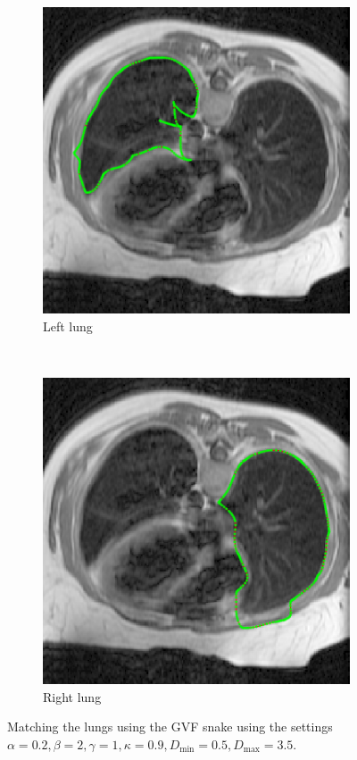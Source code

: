 \documentclass[a4paper]{article}
\begin{document}
\begin{figure}
	\centering
	\begin{subfigure}[t]{.45\textwidth}
		\includegraphics[width=\textwidth]{leftgvf}
		\caption{Left lung}
	\end{subfigure}~
	\begin{subfigure}[t]{.45\textwidth}
		\includegraphics[width=\textwidth]{rightgvf}
		\caption{Right lung}
	\end{subfigure}
	\caption{Matching the lungs using the GVF snake using the settings $\alpha=0.2, \beta=2, \gamma=1, \kappa=0.9, D_\text{min}=0.5, D_\text{max}=3.5$.}
	\label{fig:ex3}
\end{figure}
\end{document}
